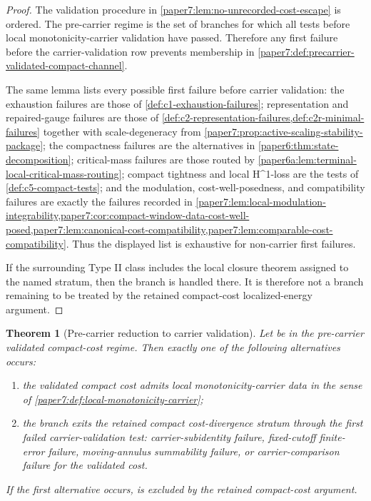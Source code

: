 \documentclass[11pt]{amsart}
\def\({}%
\def\){}%
\theoremstyle{plain}
\newtheorem{theorem}{Theorem}[section]
\theoremstyle{definition}
\theoremstyle{remark}
\begin{document}
\begin{proof}
The validation procedure in
\cref{paper7:lem:no-unrecorded-cost-escape} is ordered.  The
pre-carrier regime is the set of branches for which all tests before
local monotonicity-carrier validation have passed.  Therefore any first failure
before the carrier-validation row prevents membership in
\cref{paper7:def:precarrier-validated-compact-channel}.
\par
The same lemma lists every possible first failure before carrier validation:
the exhaustion failures are those of
\cref{def:c1-exhaustion-failures}; representation and repaired-gauge failures
are those of
\cref{def:c2-representation-failures,def:c2r-minimal-failures} together with
scale-degeneracy from
\cref{paper7:prop:active-scaling-stability-package}; the compactness failures
are the alternatives in
\cref{paper6:thm:state-decomposition}; critical-mass failures are those routed
by \cref{paper6a:lem:terminal-local-critical-mass-routing}; compact tightness
and local \(H^1\)-loss are the tests of \cref{def:c5-compact-tests}; and the
modulation, cost-well-posedness, and compatibility failures are exactly the
failures recorded in
\cref{paper7:lem:local-modulation-integrability,paper7:cor:compact-window-data-cost-well-posed,paper7:lem:canonical-cost-compatibility,paper7:lem:comparable-cost-compatibility}.
Thus the displayed list is exhaustive for non-carrier first failures.
\par
If the surrounding Type II class includes the local closure theorem assigned to
the named stratum, then the branch is handled there.  It is therefore not a
branch remaining to be treated by the retained compact-cost localized-energy argument.
\end{proof}

\begin{theorem}[Pre-carrier reduction to carrier validation]
\label{paper7:thm:precarrier-reduces-to-carrier}
Let \(\omega\) be in the pre-carrier validated compact-cost regime.  Then
exactly one of the following alternatives occurs:
\begin{enumerate}[label=\textup{(\roman*)}]
\item the validated compact cost admits local monotonicity-carrier data in the
sense of \cref{paper7:def:local-monotonicity-carrier};
\item the branch exits the retained compact cost-divergence stratum through the
first failed carrier-validation test: carrier-subidentity failure,
fixed-cutoff finite-error failure, moving-annulus summability failure, or
carrier-comparison failure for the validated cost.
\end{enumerate}
If the first alternative occurs, \(\omega\) is excluded by the retained
compact-cost argument.
\end{theorem}
\end{document}
